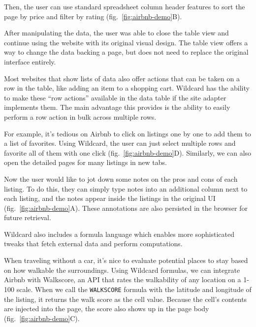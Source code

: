 \documentclass[english,submission]{programming}
\begin{document}
Then, the user can use standard spreadsheet column header features to
sort the page by price and filter by rating{
(fig.~\ref{fig:airbnb-demo}B)}.

After manipulating the data, the user was able to close the table view
and continue using the website with its original visual design. The
table view offers a way to change the data backing a page, but does not
need to replace the original interface entirely.

Most websites that show lists of data also offer actions that can be
taken on a row in the table, like adding an item to a shopping cart.
Wildcard has the ability to make these ``row actions'' available in the
data table if the site adapter implements them. The main advantage this
provides is the ability to easily perform a row action in bulk across
multiple rows.

For example, it's tedious on Airbnb to click on listings one by one to
add them to a list of favorites. Using Wildcard, the user can just
select multiple rows and favorite all of them with one click{
(fig.~\ref{fig:airbnb-demo}D)}. Similarly, we can also open the detailed
pages for many listings in new tabs.

Now the user would like to jot down some notes on the pros and cons of
each listing. To do this, they can simply type notes into an additional
column next to each listing, and the notes appear inside the listings in
the original UI{ (fig.~\ref{fig:airbnb-demo}A)}. These annotations are
also persisted in the browser for future retrieval.

Wildcard also includes a formula language which enables more
sophisticated tweaks that fetch external data and perform computations.

When traveling without a car, it's nice to evaluate potential places to
stay based on how walkable the surroundings. Using Wildcard formulas, we
can integrate Airbnb with Walkscore, an API that rates the walkability
of any location on a 1-100 scale. When we call the \texttt{WALKSCORE}
formula with the latitude and longitude of the listing, it returns the
walk score as the cell value. Because the cell's contents are injected
into the page, the score also shows up in the page body{
(fig.~\ref{fig:airbnb-demo}C)}.
\end{document}
